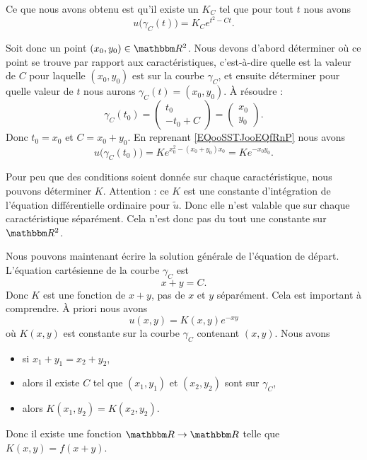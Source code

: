 Ce que nous avons obtenu est qu'il existe un \( K_C\) tel que pour tout \( t\) nous avons
\begin{equation}
    u\big( \gamma_C(t) \big)=K_C e^{t^2-Ct}.
\end{equation}

Soit donc un point \( (x_0,y_0)\in \eR^2\). Nous devons d'abord déterminer où ce point se trouve par rapport aux caractéristiques, c'est-à-dire quelle est la valeur de \( C\) pour laquelle \( (x_0,y_0)\) est sur la courbe \( \gamma_C\), et ensuite déterminer pour quelle valeur de \( t\) nous aurons \( \gamma_C(t)=(x_0,y_0)\). À résoudre :
\begin{equation}
    \gamma_C(t_0)=\begin{pmatrix}
        t_0    \\
        -t_0+C
    \end{pmatrix}=\begin{pmatrix}
        x_0    \\
        y_0
    \end{pmatrix}.
\end{equation}
Donc \( t_0=x_0\) et \( C=x_0+y_0\). En reprenant \eqref{EQooSSTJooEQfRnP} nous avons
\begin{equation}
    u\big( \gamma_C(t_0) \big)=K e^{x_0^2-(x_0+y_0)x_0}=K e^{-x_0y_0}.
\end{equation}

Pour peu que des conditions soient donnée sur chaque caractéristique, nous pouvons déterminer \( K\). Attention : ce \( K\) est une constante d'intégration de l'équation différentielle ordinaire pour \( \tilde u\). Donc elle n'est valable que sur chaque caractéristique séparément. Cela n'est donc pas du tout une constante sur \( \eR^2\).

Nous pouvons maintenant écrire la solution générale de l'équation de départ. L'équation cartésienne de la courbe \( \gamma_C\) est
\begin{equation}
    x+y=C.
\end{equation}
Donc \( K\) est une fonction de \( x+y\), pas de \( x\) et \( y\) séparément. Cela est important à comprendre. À priori nous avons
\begin{equation}
    u(x,y)=K(x,y) e^{-xy}
\end{equation}
où \( K(x,y)\) est constante sur la courbe \( \gamma_C\) contenant \( (x,y)\). Nous avons
\begin{itemize}
    \item si \( x_1+y_1=x_2+y_2\),
    \item alors il existe \( C\) tel que \( (x_1,y_1)\) et \( (x_2,y_2)\) sont sur \( \gamma_C\),
    \item alors \( K(x_1,y_2)=K(x_2,y_2)\).
\end{itemize}
Donc il existe une fonction \( \eR\to \eR\) telle que \( K(x,y)=f(x+y)\).

